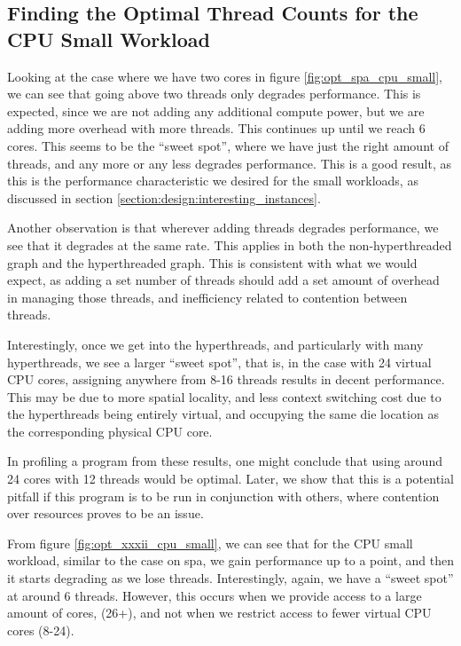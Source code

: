 \subsection{Finding the Optimal Thread Counts for the CPU Small Workload}
\label{section:results:finding_the_optimal_thread_couonts_for_the_cpu_small_workload}

Looking at the case where we have two cores in figure \ref{fig:opt_spa_cpu_small}, we can see that going above two threads only degrades performance. This is expected, since we are not adding any additional compute power, but we are adding more overhead with more threads. This continues up until we reach 6 cores. This seems to be the ``sweet spot'', where we have just the right amount of threads, and any more or any less degrades performance. This is a good result, as this is the performance characteristic we desired for the small workloads, as discussed in section \ref{section:design:interesting_instances}.

Another observation is that wherever adding threads degrades performance, we see that it degrades at the same rate. This applies in both the non-hyperthreaded graph and the hyperthreaded graph. This is consistent with what we would expect, as adding a set number of threads should add a set amount of overhead in managing those threads, and inefficiency related to contention between threads.

Interestingly, once we get into the hyperthreads, and particularly with many hyperthreads, we see a larger ``sweet spot'', that is, in the case with 24 virtual CPU cores, assigning anywhere from 8-16 threads results in decent performance. This may be due to more spatial locality, and less context switching cost due to the hyperthreads being entirely virtual, and occupying the same die location as the corresponding physical CPU core.

In profiling a program from these results, one might conclude that using around 24 cores with 12 threads would be optimal. Later, we show that this is a potential pitfall if this program is to be run in conjunction with others, where contention over resources proves to be an issue.



From figure \ref{fig:opt_xxxii_cpu_small}, we can see that for the CPU small workload, similar to the case on spa, we gain performance up to a point, and then it starts degrading as we lose threads. Interestingly, again, we have a ``sweet spot'' at around 6 threads. However, this occurs when we provide access to a large amount of cores, (26+), and not when we restrict access to fewer virtual CPU cores (8-24).

